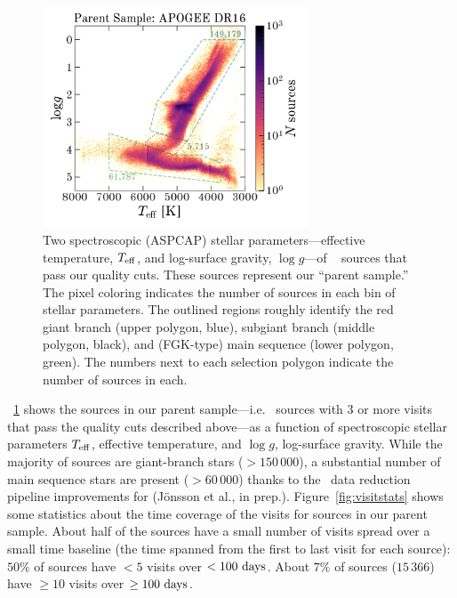 \documentclass[modern]{aastex63}
\begin{document}
\begin{figure}[!t]
\begin{center}
\includegraphics[width=0.7\textwidth]{specHR.pdf}
\end{center}
\caption{%
Two spectroscopic (ASPCAP) stellar parameters---effective temperature, $T_{\rm
eff}$, and log-surface gravity, $\log g$---of \apogee\  sources that pass
our quality cuts.
These sources represent our ``parent sample.''
The pixel coloring indicates the number of sources in each bin of stellar
parameters.
The outlined regions roughly identify the red giant branch (upper polygon,
blue), subgiant branch (middle polygon, black), and (FGK-type) main sequence
(lower polygon, green).
The numbers next to each selection polygon indicate the number of sources in
each.
\label{fig:specHR}
}
\end{figure}

\figurename~\ref{fig:specHR} shows the sources in our parent sample---i.e.
\apogee\ sources with 3 or more visits that pass the quality cuts described
above---as a function of spectroscopic stellar parameters $T_{\rm eff}$,
effective temperature, and $\log g$, log-surface gravity.
While the majority of sources are giant-branch stars ($>150\,000$), a
substantial number of main sequence stars are present ($>60\,000$) thanks to the
\apogee\ data reduction pipeline improvements for  (J\"onsson et al., in
prep.).
Figure~\ref{fig:visitstats} shows some statistics about the time coverage of the
visits for sources in our parent sample.
About half of the sources have a small number of visits spread over a small time
baseline (the time spanned from the first to last visit for each source): $50\%$
of sources have $<5$ visits over $<100~{\rm days}$.
About $7\%$ of sources ($15\,366$) have $\geq 10$ visits over $\geq 100~{\rm
days}$.
\end{document}
